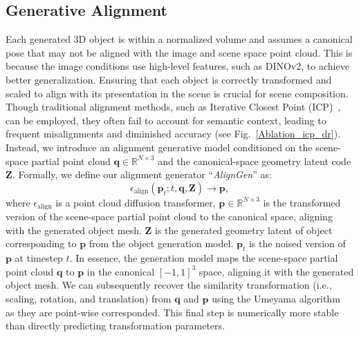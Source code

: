 \subsection{Generative Alignment}
\label{sec:transformationgen}


Each generated 3D object is within a normalized volume and assumes a canonical pose that may not be aligned with the image and scene space point cloud. 
This is because the image conditions use high-level features, such as DINOv2, to achieve better generalization.
Ensuring that each object is correctly transformed and scaled to align with its presentation in the scene is crucial for scene composition.
%
Though traditional alignment methods, such as Iterative Closest Point (ICP)~\cite{arun1987least,best1992method}, can be employed, they often fail to account for semantic context, leading to frequent misalignments and diminished accuracy (see Fig.~\ref{Ablation_icp_dr}). 
Instead, we introduce an alignment generative model conditioned on the scene-space partial point cloud $\bm{q} \in \mathbb{R}^{N\times 3}$ and the canonical-space geometry latent code $\bm{Z}$. Formally, we define our alignment generator ``\textit{AlignGen}'' as:
\begin{equation}
    \epsilon_\text{align} (\bm{p}_t; t, \bm{q}, \bm{Z}) \rightarrow \bm{p},
\end{equation}
where $\epsilon_\text{align}$ is a point cloud diffusion transformer, $\bm{p} \in \mathbb{R}^{N\times 3}$ is the transformed version of the scene-space partial point cloud to the canonical space, aligning with the generated object mesh. $\bm{Z}$ is the generated geometry latent of object corresponding to $\bm{p}$ from the object generation model. 
%
$\bm{p}_t$ is the noised version of $\bm{p}$ at timestep $t$.
% 
In essence, the generation model maps the scene-space partial point cloud $\bm{q}$ to $\bm{p}$ in the canonical $[-1,1]^3$ space, aligning it with the generated object mesh. We can subsequently recover the similarity transformation (i.e., scaling, rotation, and translation) from $\bm{q}$ and $\bm{p}$ using the Umeyama algorithm~\cite{umeyama1991least} as they are point-wise corresponded. This final step is numerically more stable than directly predicting transformation parameters.%

